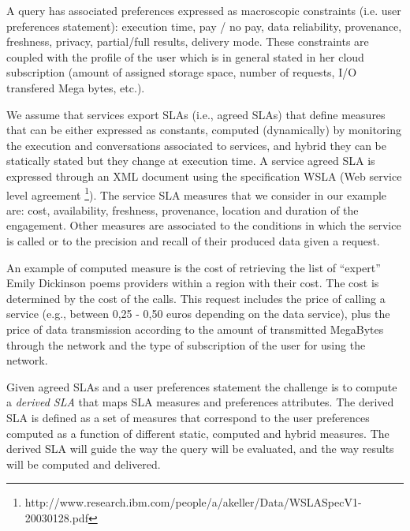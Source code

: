 A query has associated preferences  expressed as macroscopic constraints (i.e. user preferences statement): execution time, pay / no pay, data reliability, provenance, freshness, privacy, partial/full results, delivery mode. These constraints are coupled with the profile of the user which is in general stated in her cloud subscription (amount of assigned storage space, number of requests, I/O transfered Mega bytes, etc.). 

We assume that services export SLAs (i.e., agreed SLAs) that define measures   that can be either expressed as constants,  computed (dynamically) by monitoring the execution and conversations associated to services, and hybrid they can be statically stated  but they change at execution time.  A service  agreed SLA is expressed through an  XML document using the specification WSLA (Web service level agreement \footnote{\footnotesize http://www.research.ibm.com/people/a/akeller/\-Data/WSLASpecV1-20030128.pdf}). The service SLA measures  that we consider in our example are: cost, availability, freshness, provenance, location and duration of the engagement. Other measures are associated to the conditions in which the service is called or to the precision and recall of their produced data given a request. 

An example of computed measure is the cost of retrieving the list of ``expert'' Emily Dickinson poems providers within a region with their cost. 
The cost is determined by the  cost of the calls. 
This request  includes the price of calling a service (e.g.,  between 0,25 - 0,50 euros depending on the data service), plus the price of data transmission according to the amount of transmitted MegaBytes through the network and the type of subscription of the user for using the network. 

Given agreed SLAs and a user preferences statement the challenge is to compute a  {\em derived SLA} that  maps SLA measures and preferences attributes.  
The derived SLA is defined as a set of measures that correspond to the user preferences computed as a function of different static, computed and hybrid measures. 
The derived SLA  will guide the way the query will be evaluated, and the way results will be computed and delivered.

